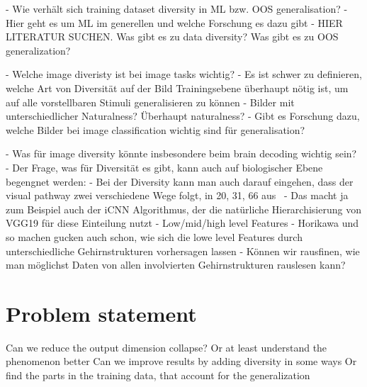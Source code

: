 - Wie verhält sich training dataset diversity in ML bzw. OOS generalisation?
    - Hier geht es um ML im generellen und welche Forschung es dazu gibt
    - HIER LITERATUR SUCHEN. Was gibt es zu data diversity? Was gibt es zu OOS generalization?

- Welche image diveristy ist bei image tasks wichtig?
    - Es ist schwer zu definieren, welche Art von Diversität auf der Bild Trainingsebene überhaupt nötig ist, um auf alle vorstellbaren Stimuli generalisieren zu können
    - Bilder mit unterschiedlicher Naturalness? Überhaupt naturalness?
    - Gibt es Forschung dazu, welche Bilder bei image classification wichtig sind für generalisation?

- Was für image diversity könnte insbesondere beim brain decoding wichtig sein?
    - Der Frage, was für Diversität es gibt, kann auch auf biologischer Ebene begengnet werden:
    - Bei der Diversity kann man auch darauf eingehen, dass der visual pathway zwei verschiedene Wege folgt, in 20, 31, 66 aus~\cite{chenExploringNaturalnessAIGenerated2023}
    - Das macht ja zum Beispiel auch der iCNN Algorithmus, der die natürliche Hierarchisierung von VGG19 für diese Einteilung nutzt
        - Low/mid/high level Features
    - Horikawa und so machen gucken auch schon, wie sich die lowe level Features durch unterschiedliche Gehirnstrukturen vorhersagen lassen
    - Können wir rausfinen, wie man möglichst Daten von allen involvierten Gehirnstrukturen rauslesen kann?

\section{Problem statement}
Can we reduce the output dimension collapse?
    Or at least understand the phenomenon better
Can we improve results by adding diversity in some ways
    Or find the parts in the training data, that account for the generalization